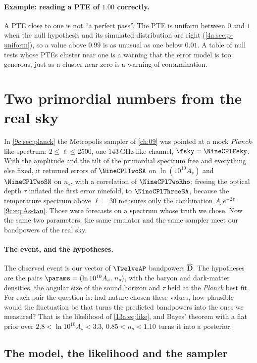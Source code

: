 \paragraph{Example: reading a PTE of $1.00$ correctly.} A PTE close to one is not ``a perfect pass''. The PTE is
uniform between $0$ and $1$ when the null hypothesis and its simulated distribution are right (\cref{4a:sec:p-uniform}), so a value
above $0.99$ is as unusual as one below $0.01$. A table of null tests whose PTEs cluster near one is a warning that the
error model is too generous, just as a cluster near zero is a warning of contamination.
\section{Two primordial numbers from the real sky}
\label{13a:sec:fit}

In \cref{9c:sec:planck} the Metropolis sampler of \cref{ch:09} was pointed at a mock \textit{Planck}-like spectrum:
$2\le\ell\le2500$, one $143$\,GHz-like channel, $\fsky=\NineCPlFsky$. With the amplitude and the tilt of the primordial
spectrum free and everything else fixed, it returned errors of $\NineCPlTwoSA$ on $\ln(10^{10}A_s)$ and $\NineCPlTwoSN$
on $n_s$, with a correlation of $\NineCPlTwoRho$; freeing the optical depth $\tau$ inflated the first error ninefold, to
$\NineCPlThreeSA$, because the temperature spectrum above $\ell=30$ measures only the combination $A_se^{-2\tau}$
\eqref{9c:eq:As-tau}. Those were forecasts on a spectrum whose truth we chose. Now the same two parameters, the same
emulator and the same sampler meet our bandpowers of the real sky.

\paragraph{The event, and the hypotheses.} The observed event is our vector of $\TwelveAP$ bandpowers $\widehat{\bm D}$. The
hypotheses are the pairs $\params=(\ln10^{10}A_s,\,n_s)$, with the baryon and dark-matter densities, the angular size of the
sound horizon and $\tau$ held at the \textit{Planck} best fit. For each pair the question is: had nature chosen these values,
how plausible would the fluctuation be that turns the predicted bandpowers into the ones we measured? That is the
likelihood of \eqref{13a:eq:like}, and Bayes' theorem with a flat prior over $2.8<\ln10^{10}A_s<3.3$, $0.85<n_s<1.10$ turns it into
a posterior.

\subsection{The model, the likelihood and the sampler}
\label{13a:sec:fit-setup}


